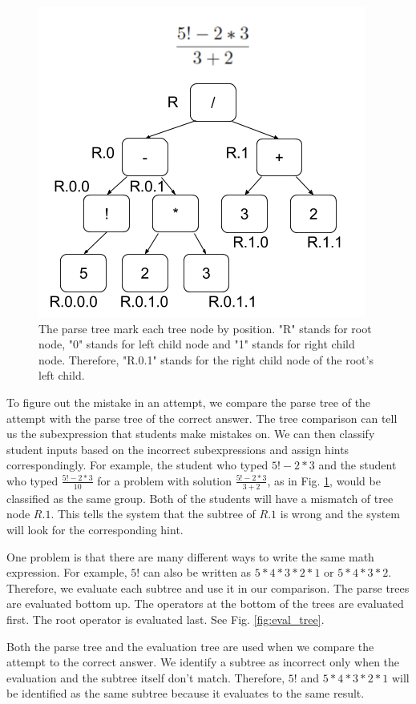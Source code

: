 \documentclass{llncs}
\begin{document}
\begin{figure}[ht]
   \centering
   \includegraphics[width=.6\textwidth]{image/Parse_Trees.png}
   \caption{The parse tree mark each tree node by position. "R" stands for root node, "0" stands for left child node and "1" stands for right child node. Therefore, "R.0.1" stands for the right child node of the root's left child.}
   \label{fig:parse_tree}
\end{figure}

To figure out the mistake in an attempt, we compare the parse tree of the attempt with the parse tree of the correct answer. The tree comparison can tell us the subexpression that students make mistakes on. We can then classify student inputs based on the incorrect subexpressions and assign hints correspondingly. For example, the student who typed $5!-2*3$ and the student who typed $\frac{5!-2*3}{10}$ for a problem with solution $\frac{5!-2*3}{3+2}$, as in Fig. \ref{fig:parse_tree}, would be classified as the same group. Both of the students will have a mismatch of tree node $R.1$. This tells the system that the subtree of $R.1$ is wrong and the system will look for the corresponding hint.

One problem is that there are many different ways to write the same math expression. For example, $5!$ can also be written as $5*4*3*2*1$ or $5*4*3*2$. Therefore, we evaluate each subtree and use it in our comparison. The parse trees are evaluated bottom up. The operators at the bottom of the trees are evaluated first. The root operator is evaluated last. See Fig. \ref{fig:eval_tree}. 

Both the parse tree and the evaluation tree are used when we compare the attempt to the correct answer. We identify a subtree as incorrect only when the evaluation and the subtree itself don't match. Therefore, $5!$ and $5*4*3*2*1$ will be identified as the same subtree because it evaluates to the same result.
\end{document}
